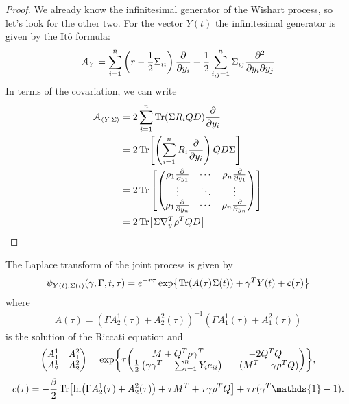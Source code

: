 \begin{proof}
    We already know the infinitesimal generator of the Wishart process, so let's look for the other two. For the vector $Y(t)$ the infinitesimal generator is given by the Itô formula:
    \begin{align*}
        \mathcal{A}_Y = \sum_{i=1}^n\left(r-\frac{1}{2}\Sigma_{ii}\right)\pdv{}{y_i}+\frac{1}{2}\sum_{i,j=1}^n\Sigma_{ij}\pdv{}{y_i}{y_j}
    \end{align*}
    In terms of the covariation, we can write
    \begin{align*}
        \mathcal{A}_{\expval{Y,\Sigma}} &= 2\sum_{i=1}^n\Tr(\Sigma R_iQD)\pdv{}{y_i} \\
        &=
        2\Tr[\left(\sum_{i=1}^nR_i\pdv{}{y_i}\right)QD\Sigma] \\
        &=
        2
        \Tr\left[\mqty(\rho_1\pdv{}{y_1} & \cdots & \rho_n\pdv{}{y_1} \\
                       \vdots            & \ddots & \vdots \\
                       \rho_1\pdv{}{y_n} & \cdots & \rho_n\pdv{}{y_n})\right] \\
        &=
        2\Tr[\Sigma\nabla_y^T\rho^TQD]
    \end{align*}
\end{proof}
\begin{proposition}
    The Laplace transform of the joint process is given by
    \begin{align}
        \psi_{Y(t),\Sigma(t)}(\gamma,\Gamma,t,\tau) = e^{-r\tau} \exp{\Tr(A(\tau)\Sigma(t))+\gamma^TY(t)+c(\tau)}
    \end{align}
    where
    \begin{align}
        A(\tau) = (\Gamma A^1_2(\tau)+A_2^2(\tau))^{-1}(\Gamma A^1_1(\tau)+A_1^2(\tau))
    \end{align}
    is the solution of the Riccati equation and
    \begin{align}
        \mqty(A_1^1 & A_1^2 \\ A_2^1 & A_2^2) = \exp{\tau\mqty(M+Q^T\rho\gamma^T & -2Q^TQ \\ \tfrac{1}{2}\left(\gamma\gamma^T-\sum_{i=1}^nY_ie_{ii}\right) & -(M^T+\gamma\rho^TQ))},
    \end{align}
    \begin{align}
        c(\tau) = -\frac{\beta}{2}\Tr[\ln(\Gamma A_2^1(\tau)+A_2^2(\tau)) + \tau M^T + \tau\gamma\rho^TQ] + \tau r (\gamma^T\mathds{1}-1).
    \end{align}
\end{proposition}
